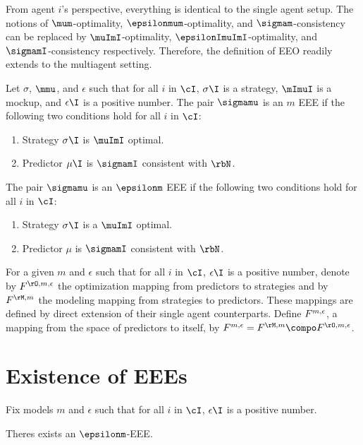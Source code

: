 From agent \(i\)'s perspective, everything is identical to the single agent setup.
The notions of \(\mum\)-optimality, \(\epsilonmum\)-optimality, and \(\sigmam\)-consistency can be replaced by \(\muImI\)-optimality, \(\epsilonImuImI\)-optimality, and \(\sigmamI\)-consistency respectively.
Therefore, the definition of EEO readily extends to the multiagent setting.
\begin{definition}
Let \(\sigma\), \(\mmu\), and \(\epsilon\) such that for all \(i\) in \(\cI\), \(\sigma\I\) is a strategy, \(\mImuI\) is a mockup, and \(\epsilon\I\) is a positive number.
The pair \(\sigmamu\) is an \(m\) EEE if the following two conditions hold for all \(i\) in \(\cI\):
\begin{enumerate}
\item Strategy \(\sigma\I\) is \(\muImI\) optimal.
\item Predictor \(\mu\I\) is \(\sigmamI\) consistent with \(\rbN\).
\end{enumerate}
The pair \(\sigmamu\) is an \(\epsilonm\) EEE if the following two conditions hold for all \(i\) in \(\cI\):
\begin{enumerate}
\item Strategy \(\sigma\I\) is a \(\muImI\) optimal.
\item Predictor \(\mu\) is \(\sigmamI\) consistent with \(\rbN\).
\end{enumerate}
\end{definition}

For a given \(m\) and \(\epsilon\) such that for all \(i\) in \(\cI\), \(\epsilon\I\) is a positive number, denote by \(\FO\) the optimization mapping from predictors to strategies and by \(\FM\) the modeling mapping from strategies to  predictors.
These mappings are defined by direct extension of their single agent counterparts.
Define \(F^{m, \epsilon}\), a mapping from the space of predictors to itself, by \(\FF = \FM \compo \FO\).


\section{Existence of EEEs}
\label{sec:existence_of_eees}


Fix models \(m\) and \(\epsilon\) such that for all \(i\) in \(\cI\), \(\epsilon\I\) is a positive number.

\begin{theorem}
\label{res:mme_existence}
Theres exists an \(\epsilonm\)-EEE.
\end{theorem}

